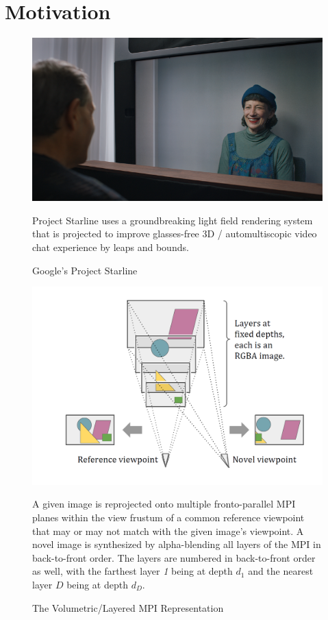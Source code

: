 \section{Motivation}\label{sec:motivation} 

\begin{figure}[!h]
    \includegraphics[width=1\columnwidth]{figures/google-starline-416.png}
    \caption{Google's Project Starline~\cite{bavor_project_2021}}
    \label{fig:google-starline}
    {\small Project Starline uses a groundbreaking light field rendering system that is projected to improve glasses-free 3D / automultiscopic video chat experience by leaps and bounds.}
\end{figure}

\begin{figure}[!h]
    \includegraphics[width=1\columnwidth]{figures/mpi-layered-representation.png}
    \caption{The Volumetric/Layered MPI Representation~\cite{zhou2018stereo}}
    \label{fig:mpi-layered-representation}
    {\small A given image is reprojected onto multiple fronto-parallel MPI planes within the view frustum of a common reference viewpoint that may or may not match with the given image's viewpoint. A novel image is synthesized by alpha-blending all layers of the MPI in back-to-front order. The layers are numbered in back-to-front order as well, with the farthest layer \textit{1} being at depth $d_1$ and the nearest layer $D$ being at depth $d_D$.}
\end{figure}

